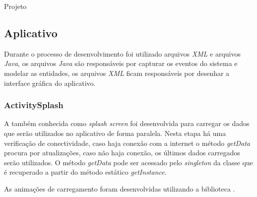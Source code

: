 \documentclass[
	12pt,				%
	openright,			%
	twoside,			%
	a4paper,			%
	english,			%
	french,				%
	spanish,			%
	brazil				%
	]{abntex2}
\begin{document}
\begin{chapter}{Projeto}
\subsection{Aplicativo}
Durante o processo de desenvolvimento foi utilizado arquivos \textit{XML} e arquivos \textit{Java}, os arquivos \textit{Java} são responsáveis por capturar os eventos do sistema e modelar as entidades, os arquivos \textit{XML} ficam responsáveis por desenhar a interface gráfica do aplicativo.

\subsubsection{ActivitySplash} \label{splash_activity}
A  também conhecida como \textit{splash screen} foi desenvolvida para carregar os dados que serão utilizados no aplicativo de forma paralela. Nesta etapa há uma verificação de conectividade, caso haja conexão com a internet o método \textit{getData} procura por atualizações, caso não haja conexão, os últimos dados carregados serão utilizados. O método \textit{getData} pode ser acessado pelo \textit{singleton} da classe  que é recuperado a partir do método estático \textit{getInstance}. 

As animações de carregamento foram desenvolvidas utilizando a biblioteca .


\end{chapter}
\end{document}
